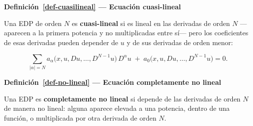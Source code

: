 \documentclass[
  spanish,
  a4paper,
]{scrbook}
\theoremstyle{definition}
\theoremstyle{plain}
\theoremstyle{definition}
\theoremstyle{plain}
\theoremstyle{definition}
\theoremstyle{remark}
\begin{document}
\begin{tcolorbox}[enhanced jigsaw, arc=.35mm, bottomrule=.15mm, breakable, colback=white, colframe=quarto-callout-note-color-frame, left=2mm, leftrule=.75mm, opacityback=0, rightrule=.15mm, toprule=.15mm]
\begin{minipage}[t]{5.5mm}
\textcolor{quarto-callout-note-color}{\faInfo}
\end{minipage}%
\begin{minipage}[t]{\textwidth - 5.5mm}

\vspace{-3mm}\textbf{Definición~\ref{def-cuasilineal} --- Ecuación cuasi-lineal}\vspace{3mm}

Una EDP de orden \(N\) es \textbf{cuasi-lineal} si es lineal en las
derivadas de orden \(N\) ---aparecen a la primera potencia y no
multiplicadas entre sí--- pero los coeficientes de esas derivadas pueden
depender de \(u\) y de sus derivadas de orden menor:

\[
\sum_{|\alpha| = N} a_\alpha\big(x,u,Du,\dots,D^{N-1}u\big)\, D^\alpha u
\;+\; a_0\big(x,u,Du,\dots,D^{N-1}u\big) = 0 .
\]

\end{minipage}%
\end{tcolorbox}

\begin{tcolorbox}[enhanced jigsaw, arc=.35mm, bottomrule=.15mm, breakable, colback=white, colframe=quarto-callout-note-color-frame, left=2mm, leftrule=.75mm, opacityback=0, rightrule=.15mm, toprule=.15mm]
\begin{minipage}[t]{5.5mm}
\textcolor{quarto-callout-note-color}{\faInfo}
\end{minipage}%
\begin{minipage}[t]{\textwidth - 5.5mm}

\vspace{-3mm}\textbf{Definición~\ref{def-no-lineal} --- Ecuación completamente no lineal}\vspace{3mm}

Una EDP es \textbf{completamente no lineal} si depende de las derivadas
de orden \(N\) de manera no lineal: alguna aparece elevada a una
potencia, dentro de una función, o multiplicada por otra derivada de
orden \(N\).

\end{minipage}%
\end{tcolorbox}
\end{document}
